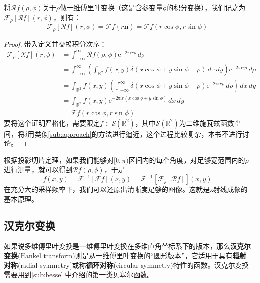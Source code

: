 \documentclass{ctexbook}
\begin{document}
\begin{theorem}[投影切片定理]
    将$\mathcal{R} f(\rho,\phi)$关于$\rho$做一维傅里叶变换（这是含参变量$\phi$的积分变换），我们记之为$\mathcal{F} _{\rho}[\mathcal{R} f](r,\phi)$，则有：
    \[\mathcal{F} _{\rho}[\mathcal{R} f](r,\phi)=\mathcal{F} f(r\hat{\mathbf{n}})=\mathcal{F} f(r\cos\phi,r\sin\phi)\]
\end{theorem}
\begin{proof}
    带入定义并交换积分次序：
    \begin{align*}
        \mathcal{F} _{\rho}[\mathcal{R} f](r,\phi)&=\int_{-\infty}^{\infty}\mathcal{R} f(\rho,\phi)\mathrm{e}^{-2\pi \mathrm{i} r \rho}\,d\rho\\
        &=\int_{-\infty}^{\infty}\left(\int_{\mathbb{R}^2}f(x,y)\delta(x\cos\phi+y\sin\phi-\rho)\,dx\,dy\right)\mathrm{e}^{-2\pi \mathrm{i} r \rho}\,d\rho\\
        &=\int_{\mathbb{R}^2}f(x,y)\left(\int_{-\infty}^{\infty}\delta(x\cos\phi+y\sin\phi-\rho)\mathrm{e}^{-2\pi \mathrm{i} r \rho}\,d\rho\right)\,dx\,dy\\
        &=\int_{\mathbb{R}^2}f(x,y)\mathrm{e}^{-2\pi \mathrm{i} r (x\cos\phi+y\sin\phi)}\,dx\,dy\\
        &=\mathcal{F} f(r\cos\phi,r\sin\phi)
    \end{align*}
    要将这个证明严格化，需要限定$f\in\mathcal{S} (\mathbb{R}^2)$，其中$\mathcal{S} (\mathbb{R}^2)$为二维施瓦兹函数空间，将$\delta$用类似\ref{sub:approach}的方法进行逼近，这个过程比较复杂，本书不进行讨论。
\end{proof}

根据投影切片定理，如果我们能够对$[0,\pi)$区间内的每个角度，对足够宽范围内的$\rho$进行测量，就可以得到$\mathcal{R} f(\rho,\phi)$，于是
\[f(x,y)=\mathcal{F} ^{-1}[\mathcal{F} f](x,y)=\mathcal{F} ^{-1}[\mathcal{F} _{\rho}[\mathcal{R} f]](x,y)\]
在充分大的采样频率下，我们可以还原出清晰度足够的图像。这就是x射线成像的基本原理。

\subsection{汉克尔变换}\label{sub:hankel}

如果说多维傅里叶变换是一维傅里叶变换在多维直角坐标系下的版本，那么\textbf{汉克尔变换}(Hankel transform)则是从一维傅里叶变换的“圆形版本”，它适用于具有\textbf{辐射对称}(radial symmetry)或称\textbf{循环对称}(circular symmetry)特性的函数。汉克尔变换需要用到\ref{sub:bessel}中介绍的第一类贝塞尔函数。
\end{document}
